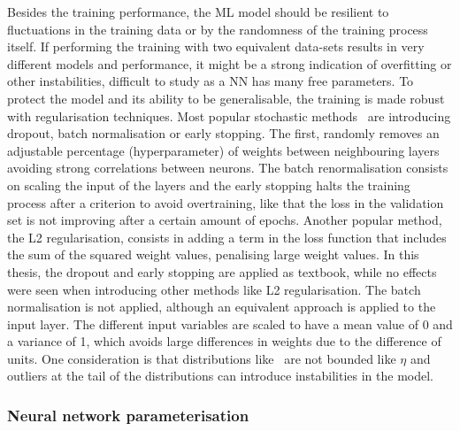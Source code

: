 Besides the training performance, the ML model should be resilient to fluctuations in the training data or by the randomness of the training process itself. If performing the training with two equivalent data-sets results in very different models and performance, it might be a strong indication of overfitting or other instabilities, difficult to study as a NN has many free parameters. To protect the model and its ability to be generalisable, the training is made robust with regularisation techniques. Most popular stochastic methods~\cite{JMLR:v15:srivastava14a,batchnorm,earlystop} are introducing dropout, batch normalisation or early stopping. The first, randomly removes an adjustable percentage (hyperparameter) of weights between neighbouring layers avoiding strong correlations between neurons. The batch renormalisation consists on scaling the input of the layers and the early stopping halts the training process after a criterion to avoid overtraining, like that the loss in the validation set is not improving after a certain amount of epochs. Another popular method, the L2 regularisation, consists in adding a term in the loss function that includes the sum of the squared weight values, penalising large weight values. In this thesis, the dropout and early stopping are applied as textbook, while no effects were seen when introducing other methods like L2 regularisation. The batch normalisation is not applied, although an equivalent approach is applied to the input layer. The different input variables are scaled to have a mean value of 0 and a variance of 1, which avoids large differences in weights due to the difference of units. One consideration is that distributions like \pT\ are not bounded like $\eta$ and outliers at the tail of the distributions can introduce instabilities in the model.

\subsubsection{Neural network parameterisation}

